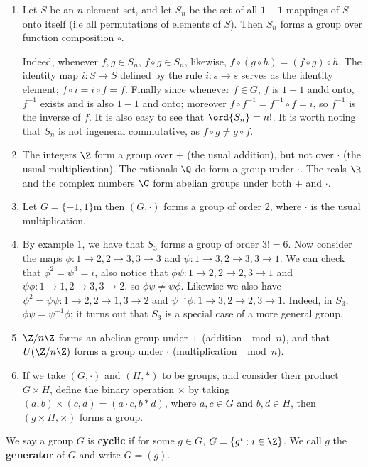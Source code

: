 \begin{example}
    \begin{enumerate}[label=(\arabic*)]
        \item Let $S$ be an  $n$ element set, and let  $S_n$ be the set of all  $1-1$ mappings of
            $S$ onto itself  (i.e all permutations of elements of $S$). Then $S_n$ forms a group
            over function composition $\circ$.

            Indeed, whenever  $f,g \in S_n$,  $f \circ g \in S_n$, likewise,  $f \circ (g \circ
            h)=(f \circ g) \circ h$. The identity map $i:S \rightarrow S$ defined by the rule  $i:s
            \rightarrow s$ serves as the identity element;  $f \circ i=i \circ f=f$. Finally since
            whenever $f \in G$,  $f$ is  $1-1$ andd onto,  $f^{-1}$ exists and is also $1-1$ and
            onto; moreover  $f \circ f^{-1}=f^{-1} \circ f=i$, so $f^{-1}$ is the inverse of $f$. It
            is also easy to see that  $\ord{S_n}=n!$. It is worth noting that $S_n$ is not ingeneral
            commutative, as  $f \circ g \neq g \circ f$.

        \item The integers $\Z$ form a group over  $+$  (the usual addition), but not over $\cdot$
            (the usual multiplication). The rationals $\Q$ do form a group under  $\cdot$. The reals
             $\R$ and the complex numbers $\C$ form abelian groups under both  $+$ and  $\cdot$.

         \item Let  $G=\{-1,1\}$m then $(G,\cdot)$ forms a group of order $2$, where  $\cdot$ is the
             usual multiplication.

         \item By example  $1$, we have that  $S_3$ forms a group of order  $3!=6$. Now consider the
             maps  $\phi:1 \rightarrow 2, 2 \rightarrow 3, 3 \rightarrow 3$ and $\psi:1 \rightarrow
             3, 2 \rightarrow 3, 3 \rightarrow 1$. We can check that  $\phi^2=\psi^3=i$, also notice
             that  $\phi\psi:1 \rightarrow 2, 2 \rightarrow 2, 3 \rightarrow 1$ and 
             $\psi\phi:1 \rightarrow 1, 2 \rightarrow 3, 3 \rightarrow 2$, so $\phi\psi \neq
             \psi\phi$. Likewise we also have  $\psi^2=\psi\psi: 1 \rightarrow 2, 2 \rightarrow 1, 3
             \rightarrow 2$ and $\psi^{-1}\phi: 1 \rightarrow 3, 2 \rightarrow 2, 3
             \rightarrow 1$. Indeed, in $ S_3$, $\phi\psi=\psi^{-1}\phi$; it turns out that $S_3$ is
             a special case of a more general group.

         \item  $\Z/n\Z$ forms an abelian group under  $+$  (addition $\mod{n}$), and that
             $U(\Z/n\Z)$ forms a group under $\cdot$  (multiplication $\mod{n}$).

         \item If we take $(G,\cdot)$ and $(H,*)$ to be groups, and consider their product $G \times
             H$, define the binary operation  $\times$ by taking  $(a,b) \times (c,d)=(a \cdot c,
             b*d)$, where $a,c \in G$ and  $b,d \in H$, then  $(g \times H, \times)$ forms a group.
    \end{enumerate}		
\end{example} 

\begin{definition}
    We say a group $G$ is \textbf{cyclic} if for some $g \in G$,  $G=\{g^i:i \in \Z\}$. We call $g$
    the \textbf {generator} of $G$ and write  $G=(g)$.
\end{definition}
